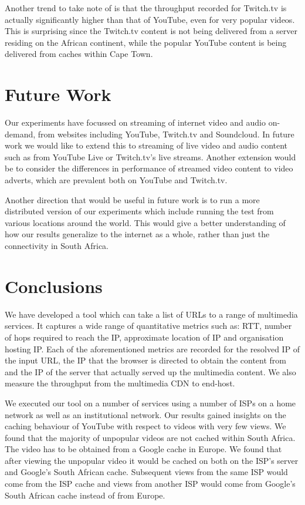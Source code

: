 \documentclass{sig-alternate-05-2015}
\begin{document}
Another trend to take note of is that the throughput recorded for Twitch.tv is actually significantly higher than that of YouTube, even for very popular videos. This is surprising since the Twitch.tv content is not being delivered from a server residing on the African continent, while the popular YouTube content is being delivered from caches within Cape Town.

\section{Future Work}\label{sec:futurework}
Our experiments have focussed on streaming of internet video and audio on-demand, from websites including YouTube, Twitch.tv and Soundcloud. In future work we would like to extend this to streaming of live video and audio content such as from YouTube Live or Twitch.tv's live streams. Another extension would be to consider the differences in performance of streamed video content to video adverts, which are prevalent both on YouTube and Twitch.tv.

Another direction that would be useful in future work is to run a more distributed version of our experiments which include running the test from various locations around the world. This would give a better understanding of how our results generalize to the internet as a whole, rather than just the connectivity in South Africa.

\section{Conclusions}
We have developed a tool which can take a list of URLs to a range of multimedia services. It captures a wide range of quantitative metrics such as: RTT, number of hops required to reach the IP, approximate location of IP and organisation hosting IP. Each of the aforementioned metrics are recorded for the resolved IP of the input URL, the IP that the browser is directed to obtain the content from and the IP of the server that actually served up the multimedia content. We also measure the throughput from the multimedia CDN to end-host.

We executed our tool on a number of services using a number of ISPs on a home network as well as an institutional network. Our results gained insights on the caching behaviour of YouTube with respect to videos with very few views. We found that the majority of unpopular videos are not cached within South Africa. The video has to be obtained from a Google cache in Europe. We found that after viewing the unpopular video it would be cached on both on the ISP's server and Google's South African cache. Subsequent views from the same ISP would come from the ISP cache and views from another ISP would come from Google's South African cache instead of from Europe.
\end{document}
